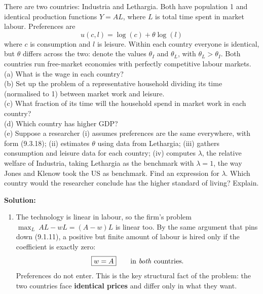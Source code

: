 \documentclass[12pt, letterpaper]{article}
\begin{document}
\begin{tcolorbox}[oddbox,title={Problem 9.5 \quad Differences in Preferences}]
\begin{tcolorbox}[questionbox]
There are two countries: Industria and Lethargia. Both have population 1 and identical
production functions $Y=AL$, where $L$ is total time spent in market labour. Preferences are
\[u(c,l)=\log(c)+\theta\log(l)\tag{9.3.18}\]
where $c$ is consumption and $l$ is leisure. Within each country everyone is identical, but
$\theta$ differs across the two: denote the values $\theta_I$ and $\theta_L$, with
$\theta_L>\theta_I$. Both countries run free-market economies with perfectly competitive
labour markets.\\[3pt]
(a) What is the wage in each country?\\
(b) Set up the problem of a representative household dividing its time (normalised to 1)
between market work and leisure.\\
(c) What fraction of its time will the household spend in market work in each country?\\
(d) Which country has higher GDP?\\
(e) Suppose a researcher (i) assumes preferences are the same everywhere, with form
(9.3.18); (ii) estimates $\theta$ using data from Lethargia; (iii) gathers consumption and
leisure data for each country; (iv) computes $\lambda$, the relative welfare of Industria,
taking Lethargia as the benchmark with $\lambda=1$, the way Jones and Klenow took the US as
benchmark. Find an expression for $\lambda$. Which country would the researcher conclude has
the higher standard of living? Explain.
\end{tcolorbox}

\textbf{Solution:}

\begin{enumerate}
\item The technology is linear in labour, so the firm's problem
$\max_L\ AL-wL=(A-w)L$ is linear too. By the same argument that pins down (9.1.11), a
positive but finite amount of labour is hired only if the coefficient is exactly zero:
\[
\boxed{w=A}\qquad\text{in \emph{both} countries.}
\]
Preferences do not enter. This is the key structural fact of the problem: the two countries
face \textbf{identical prices} and differ only in what they want.


\end{enumerate}
\end{tcolorbox}
\end{document}
